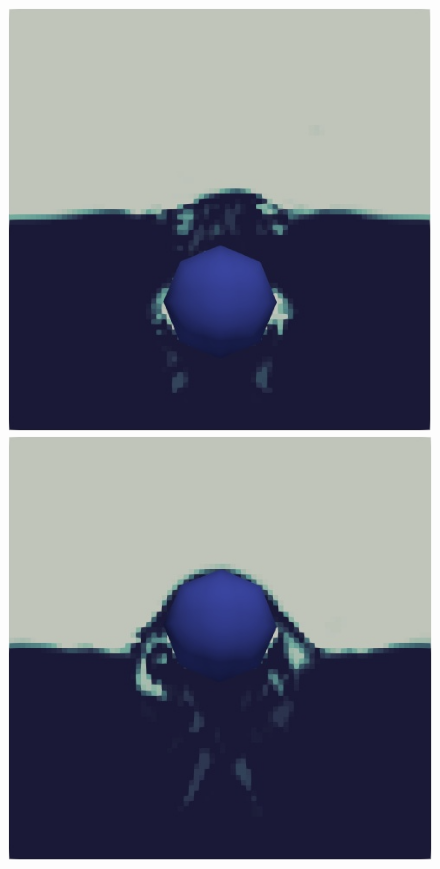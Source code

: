 \begin{figure}[H]
\begin{minipage}{.4\textwidth}
    \end{minipage}
    \newline
    \begin{minipage}{.4\textwidth}
        \centering
        \includegraphics[width=\linewidth]{GWU_Thesis_Sarmakeeva/Images/chap4/water_sphere/sphere_in_water09.png}
    \end{minipage}%
    \hspace{0.06\textwidth}
    \begin{minipage}{.4\textwidth}
        \centering
        \includegraphics[width=\linewidth]{GWU_Thesis_Sarmakeeva/Images/chap4/water_sphere/sphere_in_water12.png}

\end{minipage}
\end{figure}
